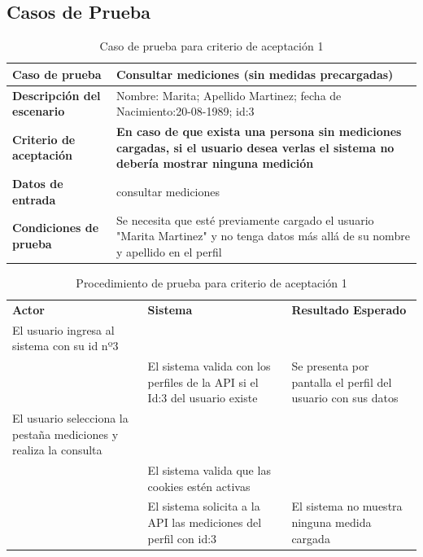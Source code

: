\documentclass[a4paper,12pt]{article}
\begin{document}
\subsection{Casos de Prueba}


	{\scriptsize
	\begin{table}[h]
	\centering
	\begin{tabular}{||l|p{10cm}||}
    	\rowcolor[gray]{0.9}
	    \hline 
        \hline 
	    \textbf{Caso de prueba} & \textbf{Consultar mediciones (sin medidas precargadas)}\\  \hline
	    \textbf{Descripción del escenario}& Nombre: Marita; Apellido Martinez; fecha de Nacimiento:20-08-1989; id:3  \\ \hline
	    \textbf{Criterio de aceptación}&  \textbf{En caso de que exista una persona sin mediciones cargadas, si el usuario desea verlas el sistema no debería mostrar ninguna medición } \\ \hline
        \textbf{Datos de entrada}&  consultar mediciones\\ \hline
        \textbf{Condiciones de  prueba}& Se necesita que esté previamente cargado el usuario "Marita Martinez" y no tenga datos más allá de su nombre y apellido en el perfil \\ \hline \hline
	    \end{tabular}
        \caption{Caso de prueba para criterio de aceptación 1}
    	\end{table}
	}
  
{\scriptsize
	\begin{table}[h]
    \centering
	\begin{longtable}{|p{5cm}|p{5cm}|p{5cm}|}
	    \hline \hline \rowcolor[gray]{0.9}
        \multicolumn{3}{||l|}{\textbf{Procedimiento de Prueba - ``Consultar mediciones''}} \\
        \hline \rowcolor[gray]{0.9}
		    \textbf{Actor} & 
	        \textbf{Sistema}& 
        	\textbf{Resultado Esperado} \\  
        \hline
	    El usuario ingresa al sistema con su id nº3	& &\\ \hline
        		& El sistema valida con los perfiles de la API si el Id:3 del usuario existe& Se presenta por pantalla el perfil del usuario con sus datos  \\ \hline        
	    El usuario selecciona la pestaña mediciones y realiza la consulta& &\\ \hline
      	&El sistema valida que las cookies estén activas&\\ \hline
   		&El sistema solicita a la API las mediciones del perfil con id:3&El sistema no muestra ninguna medida cargada \\ \hline 
	    \end{longtable}
		\caption{Procedimiento de prueba para criterio de aceptación 1}
    	\end{table}
	}
    
\end{document}
